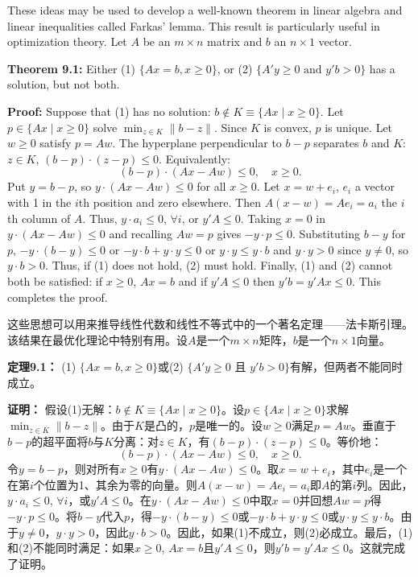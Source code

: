 \begin{original}
These ideas may be used to develop a well-known theorem in linear algebra and linear inequalities called Farkas' lemma. This result is particularly useful in optimization theory. Let $A$ be an $m \times n$ matrix and $b$ an $n \times 1$ vector.

\textbf{Theorem 9.1:} Either (1) $\{Ax = b, x \ge 0\}$, or (2) $\{A'y \ge 0 \text{ and } y'b > 0\}$ has a solution, but not both.

\textbf{Proof:} Suppose that (1) has no solution: $b \notin K \equiv \{Ax \mid x \ge 0\}$. Let $p \in \{Ax \mid x \ge 0\}$ solve $\min_{z \in K} \|b - z\|$. Since $K$ is convex, $p$ is unique. Let $w \ge 0$ satisfy $p = Aw$. The hyperplane perpendicular to $b - p$ separates $b$ and $K$: $z \in K$, $(b - p) \cdot (z - p) \le 0$. Equivalently:
\[
(b - p) \cdot (Ax - Aw) \le 0, \quad x \ge 0.
\]
Put $y = b - p$, so $y \cdot (Ax - Aw) \le 0$ for all $x \ge 0$. Let $x = w + e_i$, $e_i$ a vector with 1 in the $i$th position and zero elsewhere. Then $A(x - w) = A e_i = a_i$ the $i$th column of $A$. Thus, $y \cdot a_i \le 0$, $\forall i$, or $y'A \le 0$. Taking $x = 0$ in $y \cdot (Ax - Aw) \le 0$ and recalling $Aw = p$ gives $-y \cdot p \le 0$. Substituting $b - y$ for $p$, $-y\cdot(b - y) \le 0$ or $-y\cdot b + y\cdot y \le 0$ or $y \cdot y \le y \cdot b$ and $y \cdot y > 0$ since $y \ne 0$, so $y \cdot b > 0$. Thus, if (1) does not hold, (2) must hold. Finally, (1) and (2) cannot both be satisfied: if $x \ge 0$, $Ax = b$ and if $y'A \le 0$ then $y'b = y'Ax \le 0$. This completes the proof.
\end{original}
\begin{translation}
这些思想可以用来推导线性代数和线性不等式中的一个著名定理——法卡斯引理。该结果在最优化理论中特别有用。设$A$是一个$m \times n$矩阵，$b$是一个$n \times 1$向量。

\textbf{定理9.1：} (1) $\{Ax = b, x \ge 0\}$或(2) $\{A'y \ge 0 \text{ 且 } y'b > 0\}$有解，但两者不能同时成立。

\textbf{证明：} 假设(1)无解：$b \notin K \equiv \{Ax \mid x \ge 0\}$。设$p \in \{Ax \mid x \ge 0\}$求解$\min_{z \in K} \|b - z\|$。由于$K$是凸的，$p$是唯一的。设$w \ge 0$满足$p = Aw$。垂直于$b - p$的超平面将$b$与$K$分离：对$z \in K$，有$(b - p) \cdot (z - p) \le 0$。等价地：
\[
(b - p) \cdot (Ax - Aw) \le 0, \quad x \ge 0.
\]
令$y = b - p$，则对所有$x \ge 0$有$y \cdot (Ax - Aw) \le 0$。取$x = w + e_i$，其中$e_i$是一个在第$i$个位置为1、其余为零的向量。则$A(x - w) = A e_i = a_i$即$A$的第$i$列。因此，$y \cdot a_i \le 0$, $\forall i$，或$y'A \le 0$。在$y \cdot (Ax - Aw) \le 0$中取$x = 0$并回想$Aw = p$得$-y \cdot p \le 0$。将$b - y$代入$p$，得$-y\cdot(b - y) \le 0$或$-y\cdot b + y\cdot y \le 0$或$y \cdot y \le y \cdot b$。由于$y \ne 0$，$y \cdot y > 0$，因此$y \cdot b > 0$。因此，如果(1)不成立，则(2)必成立。最后，(1)和(2)不能同时满足：如果$x \ge 0$, $Ax = b$且$y'A \le 0$，则$y'b = y'Ax \le 0$。这就完成了证明。
\end{translation}

